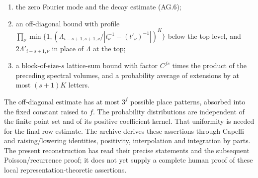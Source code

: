 \begin{enumerate}
 \item the zero Fourier mode and the decay estimate (AG.6);
 \item an off-diagonal bound with profile
 \(\prod_\nu\min\{1,
   (\Lambda_{i-s+1,s+1,\nu}/|t_\nu^{-1}-(t'_\nu)^{-1}|)^K\}\)
 below the top level, and \(2\Lambda'_{i-s+1,\nu}\) in place
 of \(\Lambda\) at the top;
 \item a block-of-size-\(s\) lattice-sum bound with factor
 \(C^{fs}\) times the product of the preceding spectral
 volumes, and a probability average of extensions by at
 most \((s+1)K\) letters.
\end{enumerate}

The off-diagonal estimate has at most \(3^f\) possible place
patterns, absorbed into the fixed constant raised to \(f\).
The probability distributions are independent of the finite
point set and of its positive coefficient kernel.  That
uniformity is needed for the final row estimate.
The archive derives these assertions through Capelli and
raising/lowering identities, positivity, interpolation and
integration by parts.  The present reconstruction has read their
precise statements and the subsequent Poisson/recurrence proof;
it does not yet supply a complete human proof of these local
representation-theoretic assertions.
